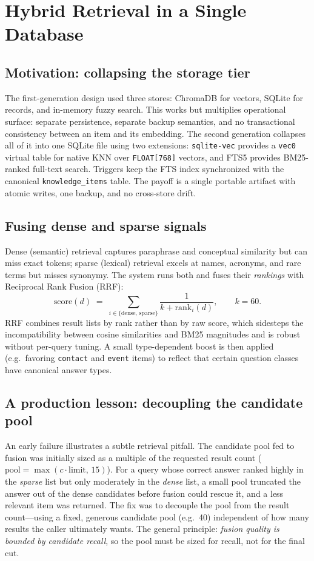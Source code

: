 \documentclass[11pt,letterpaper]{article}
\newcommand{\code}[1]{\texttt{\small #1}}
\begin{document}
\section{Hybrid Retrieval in a Single Database}
\label{sec:hybrid}

\subsection{Motivation: collapsing the storage tier}
The first-generation design used three stores: ChromaDB for vectors, SQLite for
records, and in-memory fuzzy search. This works but multiplies operational surface:
separate persistence, separate backup semantics, and no transactional consistency
between an item and its embedding. The second generation collapses all of it into one
SQLite file using two extensions: \code{sqlite-vec} provides a \code{vec0} virtual
table for native KNN over \code{FLOAT[768]} vectors, and FTS5 provides BM25-ranked
full-text search. Triggers keep the FTS index synchronized with the canonical
\code{knowledge\_items} table. The payoff is a single portable artifact with atomic
writes, one backup, and no cross-store drift.

\subsection{Fusing dense and sparse signals}
Dense (semantic) retrieval captures paraphrase and conceptual similarity but can miss
exact tokens; sparse (lexical) retrieval excels at names, acronyms, and rare terms but
misses synonymy. The system runs both and fuses their \emph{rankings} with Reciprocal
Rank Fusion (RRF):
\[
\mathrm{score}(d) \;=\; \sum_{i \in \{\text{dense},\,\text{sparse}\}}
\frac{1}{k + \mathrm{rank}_i(d)}, \qquad k = 60 .
\]
RRF combines result lists by rank rather than by raw score, which sidesteps the
incompatibility between cosine similarities and BM25 magnitudes and is robust without
per-query tuning. A small type-dependent boost is then applied (e.g.\ favoring
\code{contact} and \code{event} items) to reflect that certain question classes have
canonical answer types.

\subsection{A production lesson: decoupling the candidate pool}
An early failure illustrates a subtle retrieval pitfall. The candidate pool fed to
fusion was initially sized as a multiple of the requested result count
($\text{pool}=\max(c\cdot\text{limit},\,15)$). For a query whose correct answer ranked
highly in the \emph{sparse} list but only moderately in the \emph{dense} list, a small
pool truncated the answer out of the dense candidates before fusion could rescue it,
and a less relevant item was returned. The fix was to decouple the pool from the
result count---using a fixed, generous candidate pool (e.g.\ 40) independent of how
many results the caller ultimately wants. The general principle: \emph{fusion quality
is bounded by candidate recall}, so the pool must be sized for recall, not for the
final cut.
\end{document}
